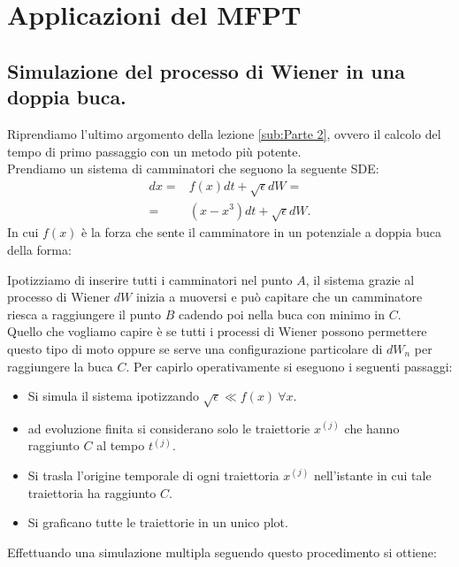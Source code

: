 \section{Applicazioni del MFPT}%
\label{sub:Lezione 12}
\mylocaltoc
\subsection{Simulazione del processo di Wiener in una doppia buca.}%
\label{sub:Simulazione dei camminatori.}
Riprendiamo l'ultimo argomento della lezione \ref{sub:Parte 2}, ovvero il calcolo del tempo di primo passaggio con un metodo più potente. \\
Prendiamo un sistema di camminatori che seguono la seguente SDE:
\begin{equation}
\begin{aligned}
    dx = & f(x) dt + \sqrt{\epsilon} dW = \\
    = & \left(x-x^3\right)dt + \sqrt{\epsilon} dW
.\end{aligned}
\label{eq:12_beg}
\end{equation}
In cui $f(x)$ è la forza che sente il camminatore in un potenziale a doppia buca della forma:

\noindent
Ipotizziamo di inserire tutti i camminatori nel punto $A$, il sistema grazie al processo di Wiener $dW$ inizia a muoversi e può capitare che un camminatore riesca a raggiungere il punto $B$ cadendo poi nella buca con minimo in $C$. \\
Quello che vogliamo capire è se tutti i processi di Wiener possono permettere questo tipo di moto oppure se serve una configurazione particolare di $dW_n$ per raggiungere la buca $C$. Per capirlo operativamente si eseguono i seguenti passaggi:
\begin{itemize}
    \item Si simula il sistema ipotizzando $\sqrt{\epsilon} \ll f(x) \ \forall x$.
    \item ad evoluzione finita si considerano solo le traiettorie $x^{(j)}$ che hanno raggiunto $C$ al tempo $t^{(j)}$.
    \item Si trasla l'origine temporale di ogni traiettoria $x^{(j)}$ nell'istante in cui tale traiettoria ha raggiunto $C$.
    \item Si graficano tutte le traiettorie in un unico plot.
\end{itemize}
Effettuando una simulazione multipla seguendo questo procedimento si ottiene:
